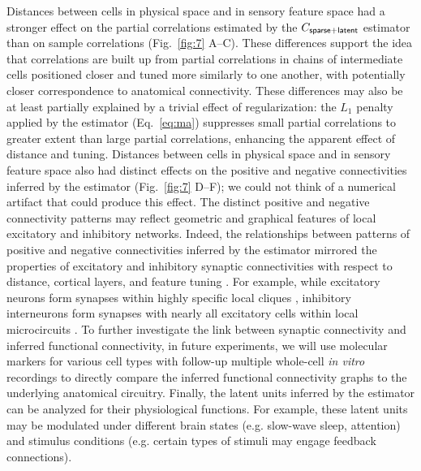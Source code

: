 Distances between cells in physical space and in sensory feature space had a stronger effect on the partial correlations estimated by the $C_{\sf sparse+latent}$ estimator than on sample correlations (Fig.~\ref{fig:7} A--C).
These differences support the idea that correlations are built up from partial correlations in chains of intermediate cells positioned closer and tuned more similarly to one another, with potentially closer correspondence to anatomical connectivity.  These differences may also be at least partially explained by a trivial effect of regularization: the $L_1$ penalty applied by the estimator (Eq.~\ref{eq:ma}) suppresses small partial correlations to greater extent than large partial correlations, enhancing the apparent effect of distance and tuning.  Distances between cells in physical space and in sensory feature space also had distinct effects on the positive and negative connectivities inferred by the estimator (Fig.~\ref{fig:7} D--F); we could not think of a numerical artifact that could produce this effect. The distinct positive and negative connectivity patterns  may reflect geometric and graphical features of local excitatory and inhibitory networks. Indeed, the relationships between patterns of positive and negative connectivities inferred by the estimator mirrored the properties of excitatory and inhibitory synaptic connectivities with respect to distance, cortical layers, and feature tuning \cite{Song:2005, Oswald:2008, Adesnik:2010, Perin:2011, Fino:2011, Hofer:2011, Isaacson:2011, Levy:2012}. For example, while excitatory neurons form synapses within highly specific local cliques \cite{Perin:2011}, inhibitory interneurons form synapses with nearly all excitatory cells within local microcircuits \cite{Fino:2011, Hofer:2011, Packer:2011}.  To further investigate the link between synaptic connectivity and inferred functional connectivity, in future experiments, we will use molecular markers for various cell types with follow-up multiple whole-cell \emph{in vitro} recordings \cite{Hofer:2011, Ko:2013} to directly compare the inferred functional connectivity graphs to the underlying anatomical circuitry. Finally, the latent units inferred by the estimator can be analyzed for their physiological functions. For example, these latent units may be modulated under different brain states (e.g. slow-wave sleep, attention) and stimulus conditions (e.g. certain types of stimuli may engage feedback connections).


